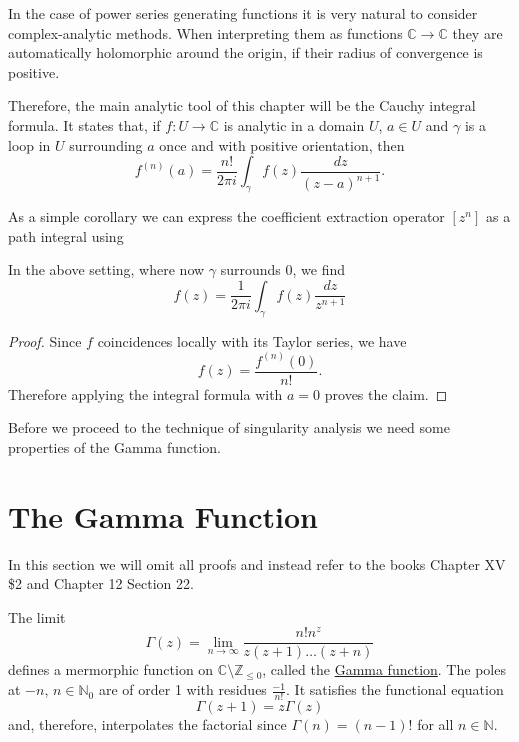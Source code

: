 In the case of power series generating functions it is very natural to consider complex-analytic methods. 
When interpreting them as functions $\mathbb{C} \to \mathbb{C}$ they are automatically holomorphic around the origin, if their radius of convergence is positive.

Therefore, the main analytic tool of this chapter will be the Cauchy integral formula. 
It states that, if $f: U \to \mathbb{C}$ is analytic in a domain $U$, $a \in U$ and $\gamma$ is a loop in $U$ surrounding $a$ once and with positive orientation, then
$$
f^{(n)}(a) = \frac{n!}{2 \pi i} \int_{\gamma} f(z) \frac{dz}{(z-a)^{n+1}}.
$$

As a simple corollary we can express the coefficient extraction operator $[z^n]$ as a path integral using

\begin{thm}
In the above setting, where now $\gamma$ surrounds $0$, we find
\begin{equation*}
    [z^n] f(z) = \frac{1}{2 \pi i} \int_{\gamma} f(z) \frac{dz}{z^{n+1}}
\end{equation*}
\end{thm}

\begin{proof}
Since $f$ coincidences locally with its Taylor series, we have
\begin{equation*}
    [z^n] f(z) = \frac{f^{(n)} (0)}{n!}.
\end{equation*}
Therefore applying the integral formula with $a = 0$ proves the claim.
\end{proof}

Before we proceed to the technique of singularity analysis we need some properties of the Gamma function.










\section{The Gamma Function}
In this section we will omit all proofs and instead refer to the books \cite{complexanalysis} Chapter XV \$2 and \cite{modernanalysis} Chapter 12 Section 22.

The limit
\begin{equation}
\label{eq:gamma1}
    \Gamma(z) = \lim_{n \to \infty} \frac{n! n^z}{z(z+1)\dots(z+n)}
\end{equation}
defines a mermorphic function on $\mathbb{C} \setminus \mathbb{Z}_{\leq 0}$, called the \ul{Gamma function}.
The poles at $-n$, $n \in \mathbb{N}_0$ are of order 1 with residues $\frac{-1}{n!}$.
It satisfies the functional equation
\[
\Gamma(z+1) = z \Gamma(z)
\]
and, therefore, interpolates the factorial since $\Gamma(n) = (n-1)!$ for all $n \in \mathbb{N}$.

